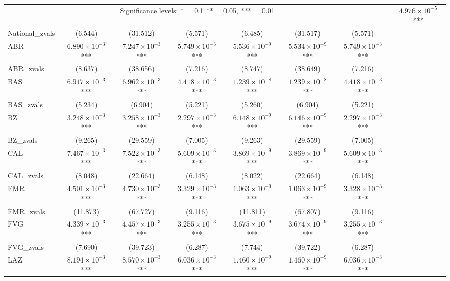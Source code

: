 \documentclass[12pt]{article}
\begin{document}
\begin{landscape}
\begin{longtable}{@{}lccccccc@{}}
		\multicolumn{7}{c}{Significance levels: * = 0.1 ** = 0.05, *** = 0.01}
		\endlastfoot
        National & $4.976 \times 10^{-5}$*** & 0.011*** & $3.626 \times 10^{-5}$*** & $1.052 \times 10^{-12}$*** & $2.289 \times 10^{-10}$*** & $3.62516 \times 10^{-5}$*** \\ 
        National\_zvals & (6.544) & (31.512) & (5.571) & (6.485) & (31.517) & (5.571) \\ 
        ABR & $6.890 \times 10^{-3}$*** & $7.247 \times 10^{-3}$*** & $5.749 \times 10^{-3}$*** & $5.536 \times 10^{-9}$*** & $5.534 \times 10^{-9}$*** & $5.749 \times 10^{-3}$*** \\ 
        ABR\_zvals & (8.637) & (38.656) & (7.216) & (8.747) & (38.649) & (7.216) \\ 
        BAS & $6.917 \times 10^{-3}$*** & $6.962 \times 10^{-3}$*** & $4.418 \times 10^{-3}$*** & $1.239 \times 10^{-8}$*** & $1.239 \times 10^{-8}$*** & $4.418 \times 10^{-3}$*** \\ 
        BAS\_zvals & (5.234) & (6.904) & (5.221) & (5.260) & (6.904) & (5.221) \\ 
        BZ & $3.248 \times 10^{-3}$*** & $3.258 \times 10^{-3}$*** & $2.297 \times 10^{-3}$*** & $6.148 \times 10^{-9}$*** & $6.146 \times 10^{-9}$*** & $2.297 \times 10^{-3}$*** \\ 
        BZ\_zvals & (9.265) & (29.559) & (7.005) & (9.263) & (29.559) & (7.005) \\ 
        CAL & $7.467 \times 10^{-3}$*** & $7.522 \times 10^{-3}$*** & $5.609 \times 10^{-3}$*** & $3.869 \times 10^{-9}$*** & $3.869 \times 10^{-9}$*** & $5.609 \times 10^{-3}$*** \\ 
        CAL\_zvals & (8.048) & (22.664) & (6.148) & (8.022) & (22.664) & (6.148) \\ 
        EMR & $4.501 \times 10^{-3}$*** & $4.730 \times 10^{-3}$*** & $3.329 \times 10^{-3}$*** & $1.063 \times 10^{-9}$*** & $1.063 \times 10^{-9}$*** & $3.328 \times 10^{-3}$*** \\ 
        EMR\_zvals & (11.873) & (67.727) & (9.116) & (11.811) & (67.807) & (9.116) \\ 
        FVG & $4.339 \times 10^{-3}$*** & $4.457 \times 10^{-3}$*** & $3.255 \times 10^{-3}$*** & $3.675 \times 10^{-9}$*** & $3.674 \times 10^{-9}$*** & $3.255 \times 10^{-3}$*** \\ 
        FVG\_zvals & (7.690) & (39.723) & (6.287) & (7.744) & (39.722) & (6.287) \\ 
        LAZ & $8.194 \times 10^{-3}$*** & $8.570 \times 10^{-3}$*** & $6.036 \times 10^{-3}$*** & $1.460 \times 10^{-9}$*** & $1.460 \times 10^{-9}$*** & $6.036 \times 10^{-3}$*** \\ 

\end{longtable}
\end{landscape}
\end{document}

